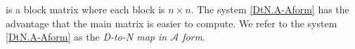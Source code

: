 \documentclass[10pt,reqno,oneside,a4paper]{article}
\begin{document}
is a block matrix where each block is $n \times n.$ The system \eqref{DtN.A-Aform} has the advantage that the main matrix is easier to compute. We refer to the system \eqref{DtN.A-Aform} as the \emph{D-to-N map in $\mathcal{A}$ form}.


{\small}
\end{document}
